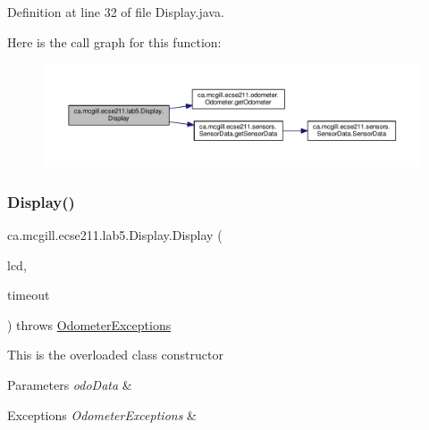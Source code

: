 Definition at line 32 of file Display.\+java.

Here is the call graph for this function\+:\nopagebreak
\begin{figure}[H]
\begin{center}
\leavevmode
\includegraphics[width=350pt]{classca_1_1mcgill_1_1ecse211_1_1lab5_1_1_display_aeb15906f02c60c1ca449d4c37922739b_cgraph}
\end{center}
\end{figure}
\mbox{\label{classca_1_1mcgill_1_1ecse211_1_1lab5_1_1_display_abb1c01962b84cfad6ff897ce490b365a}} 
\subsubsection{\texorpdfstring{Display()}{Display()}\hspace{0.1cm}{\footnotesize\ttfamily [2/2]}}
{\footnotesize\ttfamily ca.\+mcgill.\+ecse211.\+lab5.\+Display.\+Display (\begin{DoxyParamCaption}\item[{Text\+L\+CD}]{lcd,  }\item[{long}]{timeout }\end{DoxyParamCaption}) throws \hyperlink{classca_1_1mcgill_1_1ecse211_1_1odometer_1_1_odometer_exceptions}{Odometer\+Exceptions}}

This is the overloaded class constructor


\begin{DoxyParams}{Parameters}
{\em odo\+Data} & \\
\hline
\end{DoxyParams}

\begin{DoxyExceptions}{Exceptions}
{\em Odometer\+Exceptions} & \\
\hline
\end{DoxyExceptions}


